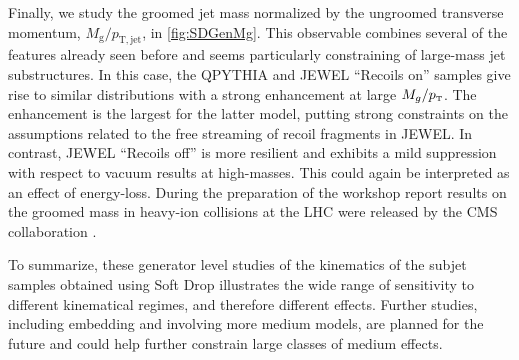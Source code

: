 Finally, we study the groomed jet mass normalized by the ungroomed transverse momentum, $M_{\mathrm{g}}/p_{\mathrm{T,jet}}$, in \autoref{fig:SDGenMg}. 
This observable combines several of the features already seen before and seems particularly constraining of large-mass jet substructures. In this case, the QPYTHIA and JEWEL ``Recoils on'' samples give rise to similar distributions with a strong enhancement at large $M_g/p_{\text{\tiny T}}$. The enhancement is the largest for the latter model, putting strong constraints on the assumptions related to the free streaming of recoil fragments in JEWEL. In contrast, JEWEL ``Recoils off'' is more resilient and exhibits a mild suppression with respect to vacuum results at high-masses. This could again be interpreted as an effect of energy-loss.
During the preparation of the workshop report results on the groomed mass in heavy-ion collisions at the LHC were released by the CMS collaboration \cite{Sirunyan:2018gct}. 

To summarize, these generator level studies of the kinematics of the subjet samples obtained using Soft Drop illustrates the wide range of sensitivity to different kinematical regimes, and therefore different effects. Further studies, including embedding and involving more medium models, are planned for the future and could help further constrain large classes of medium effects.

